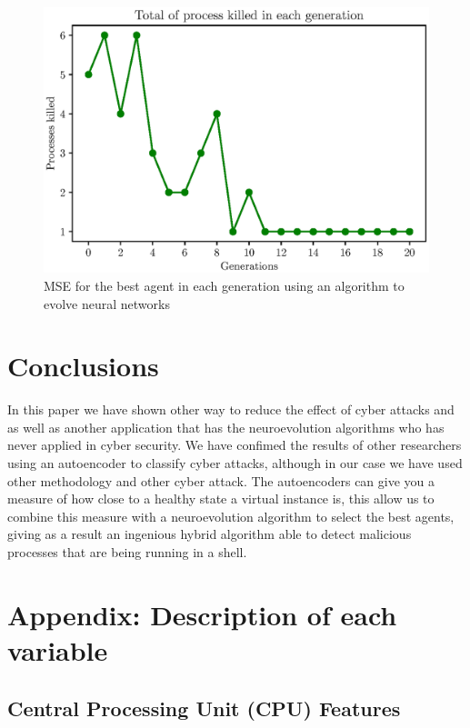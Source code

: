 \documentclass{iosart2c}
\begin{document}
\begin{figure}[h!]
\includegraphics[scale=0.5]{figs/results/number_process_final_top_agent.eps}
\vspace{-0.5cm}
\caption{MSE for the best agent in each generation using an algorithm to evolve neural networks}
\label{fig:processes_killed_top_agent}
\end{figure}


\section{Conclusions}

In this paper we have shown other way to reduce the effect of cyber attacks and as well as another application that has the neuroevolution algorithms who has never applied in cyber security. We have confimed the results of other researchers \cite{autoencoderdos} using an autoencoder to classify cyber attacks, although in our case we have used other methodology and other cyber attack. The autoencoders can give you a measure of how close to a healthy state a virtual instance is, this allow us to combine this measure with a neuroevolution algorithm to select the best agents, giving as a result an ingenious hybrid algorithm able to detect malicious processes that are being running in a shell. 

\newpage

\appendix
\section{Appendix: Description of each variable}\label{appx_variables}

\subsection{Central Processing Unit (CPU) Features}
\end{document}
